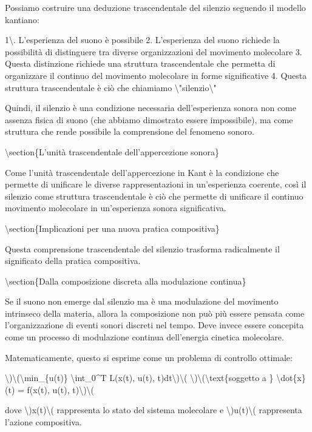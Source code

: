 \documentclass[a4paper,11pt]{article}
\begin{document}
Possiamo costruire una deduzione trascendentale del silenzio seguendo il
modello kantiano:

1\textbackslash{}. L'esperienza del suono \`e possibile 2. L'esperienza del suono
richiede la possibilit\`a di distinguere tra diverse organizzazioni del
movimento molecolare 3. Questa distinzione richiede una struttura
trascendentale che permetta di organizzare il continuo del movimento
molecolare in forme significative 4. Questa struttura trascendentale \`e
ci\`o che chiamiamo \textbackslash{}"silenzio\textbackslash{}"

Quindi, il silenzio \`e una condizione necessaria dell'esperienza sonora
non come assenza fisica di suono (che abbiamo dimostrato essere
impossibile), ma come struttura che rende possibile la comprensione del
fenomeno sonoro.

\textbackslash{}section\{L'unit\`a trascendentale dell'appercezione sonora\}

Come l'unit\`a trascendentale dell'appercezione in Kant \`e la condizione
che permette di unificare le diverse rappresentazioni in un'esperienza
coerente, cos\`i il silenzio come struttura trascendentale \`e ci\`o che
permette di unificare il continuo movimento molecolare in un'esperienza
sonora significativa.

\textbackslash{}section\{Implicazioni per una nuova pratica compositiva\}

Questa comprensione trascendentale del silenzio trasforma radicalmente
il significato della pratica compositiva.

\textbackslash{}section\{Dalla composizione discreta alla modulazione continua\}

Se il suono non emerge dal silenzio ma \`e una modulazione del movimento
intrinseco della materia, allora la composizione non pu\`o pi\`u essere
pensata come l'organizzazione di eventi sonori discreti nel tempo. Deve
invece essere concepita come un processo di modulazione continua
dell'energia cinetica molecolare.

Matematicamente, questo si esprime come un problema di controllo
ottimale:

\textbackslash{})\textbackslash{}(\textbackslash{}min\_\{u(t)\} \textbackslash{}int\_0\textasciicircum{}T L(x(t), u(t), t)dt\textbackslash{})\textbackslash{}(
\textbackslash{})\textbackslash{}(\textbackslash{}text\{soggetto a \} \textbackslash{}dot\{x\}(t) = f(x(t), u(t), t)\textbackslash{})\textbackslash{}(

dove \textbackslash{})x(t)\textbackslash{}( rappresenta lo stato del sistema molecolare e \textbackslash{})u(t)\textbackslash{}(
rappresenta l'azione compositiva.
\end{document}
